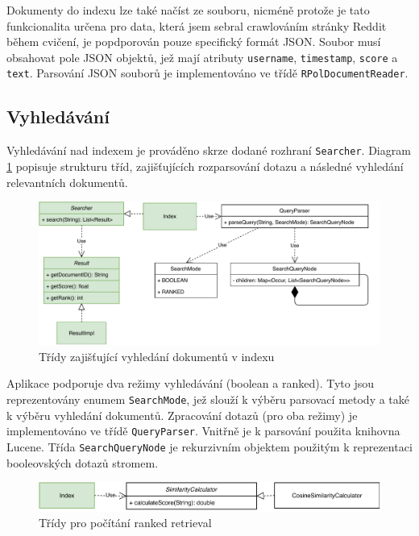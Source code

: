 \documentclass[11pt,a4paper]{scrartcl}
\begin{document}
	Dokumenty do indexu lze také načíst ze souboru, nicméně protože je tato funkcionalita určena pro data, která jsem sebral crawlováním stránky Reddit během cvičení, je popdporován pouze specifický formát JSON. Soubor musí obsahovat pole JSON objektů, jež mají atributy \verb|username|, \verb|timestamp|, \verb|score| a \verb|text|. Parsování JSON souborů je implementováno ve třídě \verb|RPolDocumentReader|.
	
	\subsection{Vyhledávání}
	
	Vyhledávání nad indexem je prováděno skrze dodané rozhraní \verb|Searcher|. Diagram \ref{fig:search-uml} popisuje strukturu tříd, zajišťujících rozparsování dotazu a následné vyhledání relevantních dokumentů.
	
	\begin{figure}[!h]
		\centering
		\includegraphics[width=\linewidth]{search-uml}
		\caption{Třídy zajišťující vyhledání dokumentů v indexu}
		\label{fig:search-uml}
	\end{figure} 
	
	Aplikace podporuje dva režimy vyhledávání (boolean a ranked). Tyto jsou reprezentovány enumem \verb|SearchMode|, jež slouží k výběru parsovací metody a také k výběru vyhledání dokumentů. Zpracování dotazů (pro oba režimy) je implementováno ve třídě \verb|QueryParser|. Vnitřně je k parsování použita knihovna Lucene. Třída \verb|SearchQueryNode| je rekurzivním objektem použitým k reprezentaci booleovských dotazů stromem. 
	
	\begin{figure}[!h]
		\centering
		\includegraphics[width=\linewidth]{cosine-uml}
		\caption{Třídy pro počítání ranked retrieval}
		\label{fig:cosine-uml}
	\end{figure} 
	
\end{document}
